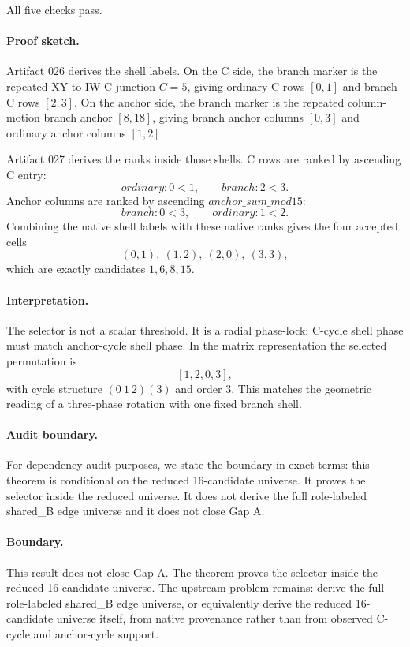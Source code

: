 All five checks pass.

\paragraph{Proof sketch.}
Artifact 026 derives the shell labels.  On the C side, the branch marker is the repeated XY-to-IW C-junction \(C=5\), giving ordinary C rows \([0,1]\) and branch C rows \([2,3]\).  On the anchor side, the branch marker is the repeated column-motion branch anchor \([8,18]\), giving branch anchor columns \([0,3]\) and ordinary anchor columns \([1,2]\).

Artifact 027 derives the ranks inside those shells.  C rows are ranked by ascending C entry:
\[
    ordinary: 0 < 1,\qquad branch: 2 < 3.
\]
Anchor columns are ranked by ascending \(anchor\_sum\_mod15\):
\[
    branch: 0 < 3,\qquad ordinary: 1 < 2.
\]
Combining the native shell labels with these native ranks gives the four accepted cells
\[
    (0,1),\ (1,2),\ (2,0),\ (3,3),
\]
which are exactly candidates \(1,6,8,15\).

\paragraph{Interpretation.}
The selector is not a scalar threshold.  It is a radial phase-lock: C-cycle shell phase must match anchor-cycle shell phase.  In the matrix representation the selected permutation is
\[
    [1,2,0,3],
\]
with cycle structure \((0\ 1\ 2)(3)\) and order 3.  This matches the geometric reading of a three-phase rotation with one fixed branch shell.



\paragraph{Audit boundary.}
For dependency-audit purposes, we state the boundary in exact terms: this theorem is conditional on the reduced 16-candidate universe. It proves the selector inside the reduced universe. It does not derive the full role-labeled shared\_B edge universe and it does not close Gap A.

\paragraph{Boundary.}
This result does not close Gap A.  The theorem proves the selector inside the reduced 16-candidate universe.  The upstream problem remains: derive the full role-labeled shared\_B edge universe, or equivalently derive the reduced 16-candidate universe itself, from native provenance rather than from observed C-cycle and anchor-cycle support.
